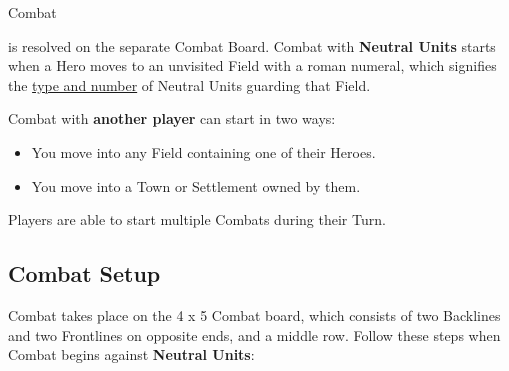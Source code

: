 
\begin{multicols}{2}

\hypertarget{Combat}{Combat} is resolved on the separate Combat Board.
Combat with \textbf{Neutral Units} starts when a Hero moves to an unvisited Field with a roman numeral, which signifies the \hyperlink{Difficulty}{type and number} of Neutral Units guarding that Field.

Combat with \textbf{another player} can start in two ways:
\begin{itemize}
  \item You move into any Field containing one of their Heroes.
  \item You move into a Town or Settlement owned by them.
\end{itemize}
Players are able to start multiple Combats during their Turn.

\subsection*{\hypertarget{Combatsetup}{Combat Setup}}

Combat takes place on the 4 x 5 Combat board, which consists of two Backlines and two Frontlines on opposite ends, and a middle row.
Follow these steps when Combat begins against \textbf{Neutral Units}:


\end{multicols}
